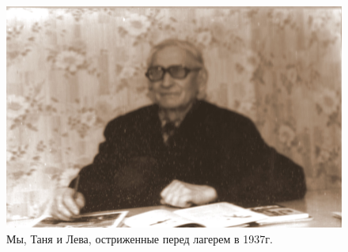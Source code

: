 \documentclass[utf8x, 10pt]{G7-32} %
\begin{document}
\vfill
\vspace{-20pt}
\begin{figure}[h!]

    \begin{minipage}[h!]{40mm}
        \caption{Мы, Таня и Лева, остриженные перед лагерем в 1937г.}
    \end{minipage}
    \hfill
   \begin{minipage}[h]{90mm}
       \includegraphics[width=\linewidth]{inc/Menshekovy/22.jpg} 

\end{minipage}
\end{figure}
\end{document}

